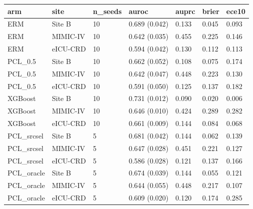 \begin{tabular}{lllllll}
\hline
arm & site & n\_seeds & auroc & auprc & brier & ece10 \\
\hline
ERM & Site B & 10 & 0.689 (0.042) & 0.133 & 0.045 & 0.093 \\
ERM & MIMIC-IV & 10 & 0.642 (0.035) & 0.455 & 0.225 & 0.146 \\
ERM & eICU-CRD & 10 & 0.594 (0.042) & 0.130 & 0.112 & 0.113 \\
PCL\_0.5 & Site B & 10 & 0.662 (0.052) & 0.108 & 0.075 & 0.174 \\
PCL\_0.5 & MIMIC-IV & 10 & 0.642 (0.047) & 0.448 & 0.223 & 0.130 \\
PCL\_0.5 & eICU-CRD & 10 & 0.591 (0.050) & 0.125 & 0.137 & 0.182 \\
XGBoost & Site B & 10 & 0.731 (0.012) & 0.090 & 0.020 & 0.006 \\
XGBoost & MIMIC-IV & 10 & 0.646 (0.010) & 0.424 & 0.289 & 0.282 \\
XGBoost & eICU-CRD & 10 & 0.661 (0.009) & 0.144 & 0.084 & 0.068 \\
PCL\_srcsel & Site B & 5 & 0.681 (0.042) & 0.144 & 0.062 & 0.139 \\
PCL\_srcsel & MIMIC-IV & 5 & 0.647 (0.028) & 0.451 & 0.221 & 0.127 \\
PCL\_srcsel & eICU-CRD & 5 & 0.586 (0.028) & 0.121 & 0.137 & 0.166 \\
PCL\_oracle & Site B & 5 & 0.674 (0.039) & 0.144 & 0.055 & 0.121 \\
PCL\_oracle & MIMIC-IV & 5 & 0.644 (0.055) & 0.448 & 0.217 & 0.107 \\
PCL\_oracle & eICU-CRD & 5 & 0.609 (0.020) & 0.120 & 0.174 & 0.285 \\
\hline
\end{tabular}
